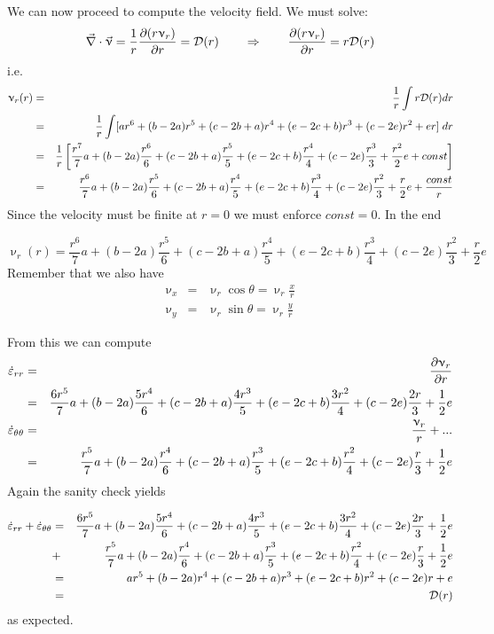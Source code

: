 We can now proceed to compute the velocity field.
We must solve:
\[
\vec\nabla \cdot \vec\upnu = \frac{1}{r}\frac{\partial (r \upnu_r) }{\partial r} =  {\cal D}(r)
\qquad
\Rightarrow
\qquad
\frac{\partial (r \upnu_r) }{\partial r} = r {\cal D}(r)
\]
i.e.
\begin{eqnarray}
\upnu_r (r) 
&=& \frac{1}{r} \int r {\cal D}(r) dr \nonumber\\
&=& \frac{1}{r} \int [ ar^6 +(b-2a) r^5+(c-2b+a)r^4+(e-2c+b)r^3 +(c-2e)r^2 + er ] \;  dr  \nonumber\\
&=& \frac{1}{r} 
\left[ \frac{r^7}{7} a 
+(b-2a)\frac{r^6}{6} 
+(c-2b+a) \frac{r^5}{5} 
+(e-2c+b) \frac{r^4}{4}
+(c-2e) \frac{r^3}{3}  
+\frac{r^2}{2} e   + const \right]  \nonumber\\
&=& 
\frac{r^6}{7} a 
+(b-2a)\frac{r^5}{6} 
+(c-2b+a) \frac{r^4}{5} 
+(e-2c+b) \frac{r^3}{4}
+(c-2e) \frac{r^2}{3}  
+\frac{r}{2} e 
+ \frac{const}{r}
\end{eqnarray}
Since the velocity must be finite at $r=0$ we must enforce $const=0$.
In the end 

\[
\boxed{
\upnu_r (r) 
=
\frac{r^6}{7} a 
+(b-2a)\frac{r^5}{6} 
+(c-2b+a) \frac{r^4}{5} 
+(e-2c+b) \frac{r^3}{4}
+(c-2e) \frac{r^2}{3}  
+\frac{r}{2} e 
}
\]
Remember that we also have 
\begin{eqnarray}
\upnu_x &=& \upnu_r \cos\theta = \upnu_r \frac{x}{r} \\ 
\upnu_y &=& \upnu_r \sin\theta = \upnu_r \frac{y}{r} 
\end{eqnarray}


From this we can compute
\begin{eqnarray}
\dot\varepsilon_{rr} 
&=& \frac{\partial \upnu_r}{\partial r} \nonumber\\
&=&  
\frac{6r^5}{7} a 
+(b-2a)\frac{5r^4}{6} 
+(c-2b+a) \frac{4r^3}{5} 
+(e-2c+b) \frac{3r^2}{4}
+(c-2e) \frac{2r}{3}  
+\frac{1}{2} e 
\nonumber\\
\dot\varepsilon_{\theta\theta}
&=& \frac{\upnu_r}{r} + ... \nonumber\\
&=& 
\frac{r^5}{7} a 
+(b-2a)\frac{r^4}{6} 
+(c-2b+a) \frac{r^3}{5} 
+(e-2c+b) \frac{r^2}{4}
+(c-2e) \frac{r}{3}  
+\frac{1}{2} e 
\end{eqnarray}
Again the sanity check yields 

\begin{eqnarray}
\dot\varepsilon_{rr} +\dot\varepsilon_{\theta\theta} 
&=&
\frac{6r^5}{7} a 
+(b-2a)\frac{5r^4}{6} 
+(c-2b+a) \frac{4r^3}{5} 
+(e-2c+b) \frac{3r^2}{4}
+(c-2e) \frac{2r}{3}  
+\frac{1}{2} e  \nonumber\\
&+& \frac{r^5}{7} a 
+(b-2a)\frac{r^4}{6} 
+(c-2b+a) \frac{r^3}{5} 
+(e-2c+b) \frac{r^2}{4}
+(c-2e) \frac{r}{3}  
+\frac{1}{2} e \nonumber\\
&=&  
a r^5  
+(b-2a) r^4
+(c-2b+a) r^3
+(e-2c+b) r^2 
+(c-2e) r 
+ e  \nonumber\\
&=& {\cal D}(r)
\end{eqnarray}
as expected.



